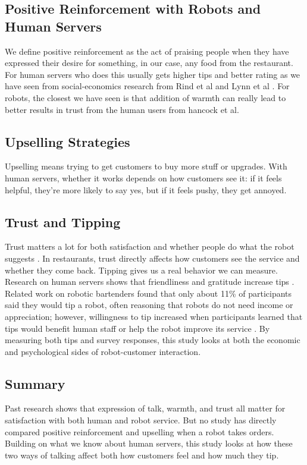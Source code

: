 \documentclass[conference]{IEEEtran}
\begin{document}
\subsection{Positive Reinforcement with Robots and Human Servers}
We define positive reinforcement as the act of praising people when they have expressed their desire for something, in our case, any food from the restaurant. For human servers who does this usually gets higher tips and better rating as we have seen from social-economics research from Rind et al and Lynn et al \cite{b3, b7}. For robots, the closest we have seen is that addition of warmth can really lead to better results in trust from the human users from hancock et al.






\subsection{Upselling Strategies}
Upselling means trying to get customers to buy more stuff or upgrades. With human servers, whether it works depends on how customers see it: if it feels helpful, they're more likely to say yes, but if it feels pushy, they get annoyed.

\subsection{Trust and Tipping}
Trust matters a lot for both satisfaction and whether people do what the robot suggests \cite{b6}. In restaurants, trust directly affects how customers see the service and whether they come back. Tipping gives us a real behavior we can measure. Research on human servers shows that friendliness and gratitude increase tips \cite{b4}. Related work on robotic bartenders found that only about 11\% of participants said they would tip a robot, often reasoning that robots do not need income or appreciation; however, willingness to tip increased when participants learned that tips would benefit human staff or help the robot improve its service \cite{b10}. By measuring both tips and survey responses, this study looks at both the economic and psychological sides of robot-customer interaction.

\subsection{Summary}
Past research shows that expression of talk, warmth, and trust all matter for satisfaction with both human and robot service. But no study has directly compared positive reinforcement and upselling when a robot takes orders. Building on what we know about human servers, this study looks at how these two ways of talking affect both how customers feel and how much they tip.
\end{document}
